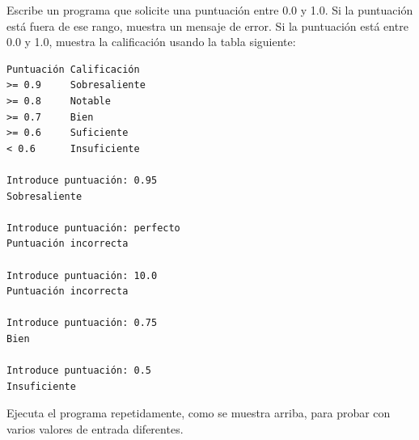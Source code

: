 \begin{ex}
Escribe un programa que solicite una puntuación entre 0.0 y 1.0.
Si la puntuación está fuera de ese rango, muestra un mensaje de error.
Si la puntuación está entre 0.0 y 1.0, muestra la calificación usando la tabla
siguiente:

\begin{verbatim}
Puntuación Calificación
>= 0.9     Sobresaliente
>= 0.8     Notable
>= 0.7     Bien
>= 0.6     Suficiente
< 0.6      Insuficiente

Introduce puntuación: 0.95
Sobresaliente

Introduce puntuación: perfecto
Puntuación incorrecta

Introduce puntuación: 10.0
Puntuación incorrecta

Introduce puntuación: 0.75
Bien

Introduce puntuación: 0.5
Insuficiente
\end{verbatim}

Ejecuta el programa repetidamente, como se muestra arriba, para probar
con varios valores de entrada diferentes.
\end{ex}